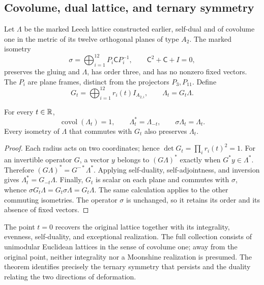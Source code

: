 \subsection{Covolume, dual lattice, and ternary symmetry}

Let \(\Lambda\) be the marked Leech lattice constructed earlier, self-dual and of covolume one in the metric of its twelve orthogonal planes of type \(A_2\). The marked isometry
\[
 \sigma=\bigoplus_{i=1}^{12}P_i\mathsf C P_i^{-1},\qquad
 \mathsf C^2+\mathsf C+I=0,
\]
preserves the gluing and \(\Lambda\), has order three, and has no nonzero fixed vectors. The \(P_i\) are plane frames, distinct from the projectors \(P_3,P_{11}\). Define
\begin{equation}
 G_t=\bigoplus_{i=1}^{12}r_i(t)I_{A_{2,i}},\qquad
 \Lambda_t=G_t\Lambda.
 \label{rec:eq:red}
\end{equation}

\begin{theorem}
\label{rec:thm:red}
For every \(t\in\mathbb R\),
\[
 \operatorname{covol}(\Lambda_t)=1,\qquad
 \Lambda_t^*=\Lambda_{-t},\qquad \sigma\Lambda_t=\Lambda_t.
\]
Every isometry of \(\Lambda\) that commutes with \(G_t\) also preserves \(\Lambda_t\).
\end{theorem}
\begin{proof}
Each radius acts on two coordinates; hence
\(\det G_t=\prod_i r_i(t)^2=1\). For an invertible operator \(G\), a vector \(y\) belongs to \((G\Lambda)^*\) exactly when \(G^*y\in\Lambda^*\). Therefore
\((G\Lambda)^*=G^{-*}\Lambda^*\). Applying self-duality, self-adjointness, and inversion gives \(\Lambda_t^*=G_{-t}\Lambda\). Finally, \(G_t\) is scalar on each plane and commutes with \(\sigma\), whence
\(\sigma G_t\Lambda=G_t\sigma\Lambda=G_t\Lambda\). The same calculation applies to the other commuting isometries. The operator \(\sigma\) is unchanged, so it retains its order and its absence of fixed vectors.
\end{proof}

The point \(t=0\) recovers the original lattice together with its integrality, evenness, self-duality, and exceptional realization. The full collection consists of unimodular Euclidean lattices in the sense of covolume one; away from the original point, neither integrality nor a Moonshine realization is presumed. The theorem identifies precisely the ternary symmetry that persists and the duality relating the two directions of deformation.

